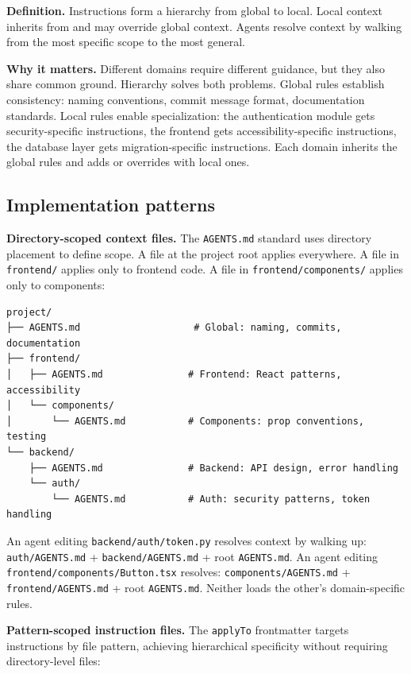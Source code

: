 \documentclass[
  a4paper,
  DIV=11,
  numbers=noendperiod]{scrreprt}
\begin{document}
\textbf{Definition.} Instructions form a hierarchy from global to local.
Local context inherits from and may override global context. Agents
resolve context by walking from the most specific scope to the most
general.

\textbf{Why it matters.} Different domains require different guidance,
but they also share common ground. Hierarchy solves both problems.
Global rules establish consistency: naming conventions, commit message
format, documentation standards. Local rules enable specialization: the
authentication module gets security-specific instructions, the frontend
gets accessibility-specific instructions, the database layer gets
migration-specific instructions. Each domain inherits the global rules
and adds or overrides with local ones.

\subsection{Implementation patterns}\label{implementation-patterns-4}

\textbf{Directory-scoped context files.} The \texttt{AGENTS.md} standard
uses directory placement to define scope. A file at the project root
applies everywhere. A file in \texttt{frontend/} applies only to
frontend code. A file in \texttt{frontend/components/} applies only to
components:

\begin{verbatim}
project/
├── AGENTS.md                    # Global: naming, commits, documentation
├── frontend/
│   ├── AGENTS.md               # Frontend: React patterns, accessibility
│   └── components/
│       └── AGENTS.md           # Components: prop conventions, testing
└── backend/
    ├── AGENTS.md               # Backend: API design, error handling
    └── auth/
        └── AGENTS.md           # Auth: security patterns, token handling
\end{verbatim}

An agent editing \texttt{backend/auth/token.py} resolves context by
walking up: \texttt{auth/AGENTS.md} + \texttt{backend/AGENTS.md} + root
\texttt{AGENTS.md}. An agent editing
\texttt{frontend/components/Button.tsx} resolves:
\texttt{components/AGENTS.md} + \texttt{frontend/AGENTS.md} + root
\texttt{AGENTS.md}. Neither loads the other's domain-specific rules.

\textbf{Pattern-scoped instruction files.} The \texttt{applyTo}
frontmatter targets instructions by file pattern, achieving hierarchical
specificity without requiring directory-level files:
\end{document}
